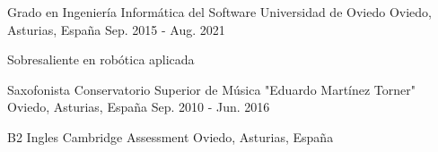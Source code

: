 

\begin{cventries}

  \cventry
  {Grado en Ingeniería Informática del Software} %
  {Universidad de Oviedo} %
  {Oviedo, Asturias, España} %
  {Sep. 2015 - Aug. 2021} %
  {
    \begin{cvitems} %
      \item {Sobresaliente en robótica aplicada}
    \end{cvitems}
  }

  \cventry
  {Saxofonista} %
  {Conservatorio Superior de Música "Eduardo Martínez Torner"} %
  {Oviedo, Asturias, España} %
  {Sep. 2010 - Jun. 2016} %
  {
    \begin{cvitems} %
    \end{cvitems}
  }

  \cventry
  {B2 Ingles} %
  {Cambridge Assessment} %
  {Oviedo, Asturias, España} %
  {} %
  {
    \begin{cvitems} %
    \end{cvitems}
  }

\end{cventries}
